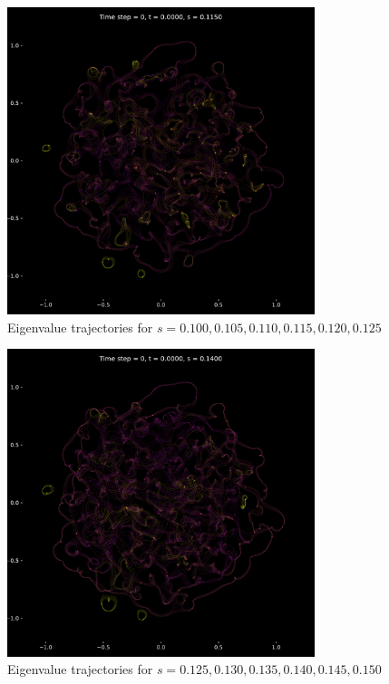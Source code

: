 \documentclass{article}
\begin{document}
	\newpage

	\begin{figure}[htbp]
		\centering
		\includegraphics[width=0.8\textwidth]{figures/frame200to250.pdf}
		\caption{Eigenvalue trajectories for $s= 0.100, 0.105, 0.110, 0.115, 0.120, 0.125$ }
		\label{fig:pdf_image}
	\end{figure}

	\newpage

	\begin{figure}[htbp]
		\centering
		\includegraphics[width=0.8\textwidth]{figures/frame250to300.pdf}
		\caption{Eigenvalue trajectories for $s= 0.125, 0.130, 0.135, 0.140, 0.145, 0.150$ }
		\label{fig:pdf_image}
	\end{figure}
\end{document}
